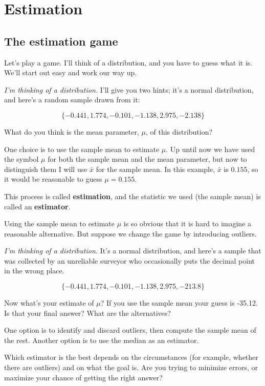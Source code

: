 \documentclass[12pt]{book}
\begin{document}
\chapter{Estimation}
\label{estimation}

\section{The estimation game}

Let's play a game.  I'll think of a distribution, and you have to guess
what it is.  We'll start out easy and work our way up.

{\em I'm thinking of a distribution.}  I'll give you two hints; it's a
normal distribution, and here's a random sample drawn from it:

\[ \{ -0.441, 1.774, -0.101, -1.138, 2.975, -2.138 \} \]

What do you think is the mean parameter, $\mu$, of this distribution?

\newcommand{\xbar}{\bar{x}}
\newcommand{\ybar}{\bar{y}}

One choice is to use the sample mean to estimate $\mu$.  Up
until now we have used the symbol $\mu$ for both the sample mean and
the mean parameter, but now to distinguish them I will use $\xbar$
for the sample mean.  In this example, $\xbar$ is $0.155$, so it would
be reasonable to guess $\mu = 0.155$.

This process is called {\bf estimation}, and the statistic we used
(the sample mean) is called an {\bf estimator}.

Using the sample mean to estimate $\mu$ is so obvious that it is hard
to imagine a reasonable alternative.  But suppose we change the game by
introducing outliers.  

{\em I'm thinking of a distribution.}  It's a normal distribution, and
here's a sample that was collected by an unreliable surveyor who
occasionally puts the decimal point in the wrong place.

\[ \{ -0.441, 1.774, -0.101, -1.138, 2.975, -213.8 \} \]

Now what's your estimate of $\mu$?  If you use the sample mean your
guess is -35.12.  Is that your final answer?  What are the alternatives?

One option is to identify and discard outliers, then compute the sample
mean of the rest.  Another option is to use the median as an estimator.

Which estimator is the best depends on the circumstances (for example,
whether there are outliers) and on what the goal is.  Are you
trying to minimize errors, or maximize your chance of getting the
right answer?
\end{document}
